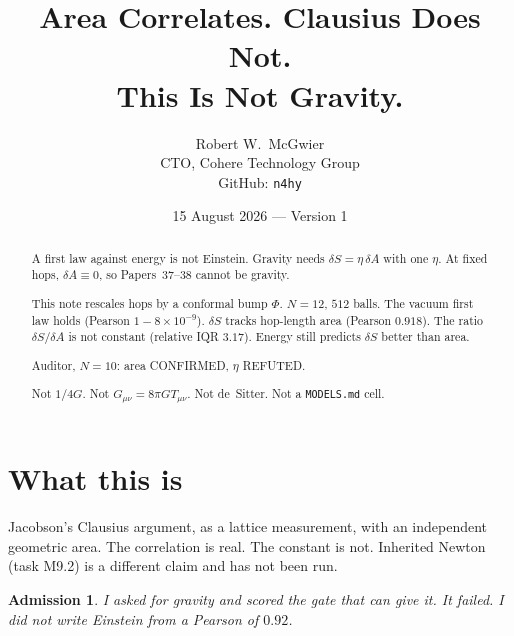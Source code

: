 \documentclass[11pt]{article}
\title{\textbf{Area Correlates. Clausius Does Not.\\
This Is Not Gravity.}}
\author{Robert W.\ McGwier\\
\small CTO, Cohere Technology Group\\
\small GitHub: \texttt{n4hy}}
\date{15 August 2026 --- Version 1}
\newtheorem*{admission}{Admission}
\begin{document}
\maketitle

\begin{abstract}
\noindent
A first law against energy is not Einstein. Gravity needs
$\delta S=\eta\,\delta A$ with one $\eta$. At fixed hops,
$\delta A\equiv 0$, so Papers~37--38 cannot be gravity.

This note rescales hops by a conformal bump $\Phi$.
$N=12$, $512$ balls. The vacuum first law holds
(Pearson $1-8\times 10^{-9}$). $\delta S$ tracks hop-length
area (Pearson $0.918$). The ratio $\delta S/\delta A$ is
not constant (relative IQR $3.17$). Energy still predicts
$\delta S$ better than area.

Auditor, $N=10$: area CONFIRMED, $\eta$ REFUTED.

Not $1/4G$. Not $G_{\mu\nu}=8\pi GT_{\mu\nu}$. Not
de~Sitter. Not a \texttt{MODELS.md} cell.
\end{abstract}

\section{What this is}

Jacobson's Clausius argument, as a lattice measurement,
with an independent geometric area. The correlation is
real. The constant is not. Inherited Newton (task M9.2)
is a different claim and has not been run.

\begin{admission}
I asked for gravity and scored the gate that can give it.
It failed. I did not write Einstein from a Pearson of
$0.92$.
\end{admission}
\end{document}
